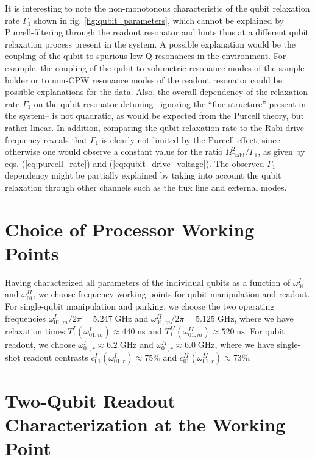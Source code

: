\smallskip

It is interesting to note the non-monotonous characteristic of the qubit relaxation rate $\Gamma_1$ shown in fig. \ref{fig:qubit_parameters}, which cannot be explained by Purcell-filtering through the readout resonator and hints thus at a different qubit relaxation process present in the system. A possible explanation would be the coupling of the qubit to spurious low-Q resonances in the environment. For example, the coupling of the qubit to volumetric resonance modes of the sample holder or to non-CPW resonance modes of the readout resonator could be possible explanations for the data. Also, the overall dependency of the relaxation rate $\Gamma_1$ on the qubit-resonator detuning --ignoring the ``fine-structure'' present in the system-- is not quadratic, as would be expected from the Purcell theory, but rather linear. In addition, comparing the qubit relaxation rate to the Rabi drive frequency reveals that $\Gamma_1$ is clearly not limited by the Purcell effect,  since otherwise one would observe a constant value for the ratio $\Omega_\mathrm{Rabi}^2/\Gamma_\mathrm{1}$, as given by eqs. (\ref{eq:purcell_rate}) and (\ref{eq:qubit_drive_voltage}). The observed $\Gamma_1$ dependency might be partially explained by taking into account the qubit relaxation through other channels such as the flux line and external modes.

\section{Choice of Processor Working Points}

Having characterized all parameters of the individual qubits as a function of $\omega_{01}^I$ and $\omega_{01}^{II}$, we choose frequency working points for qubit manipulation and readout. For single-qubit manipulation and parking, we choose the two operating frequencies $\omega_{01,m}^I/2\pi = 5.247\;\mathrm{GHz}$ and $\omega_{01,m}^{II}/2\pi = 5.125\;\mathrm{GHz}$, where we have relaxation times $T_1^I(\omega_{01,m}^I) \approx 440\;\mathrm{ns}$ and $T_1^{II}(\omega_{01,m}^{II})\approx 520\;\mathrm{ns}$. For qubit readout, we choose $\omega_{01,r}^I \approx 6.2\;\mathrm{GHz}$ and $\omega_{01,r}^{II}\approx 6.0\;\mathrm{GHz}$, where we have single-shot readout contrasts $c_{01}^I(\omega_{01,r}^I)\approx 75\%$ and $c_{01}^{II}(\omega_{01,r}^{II})\approx 73\%$.

\section{Two-Qubit Readout Characterization at the Working Point} \label{section:readout_matrix}

